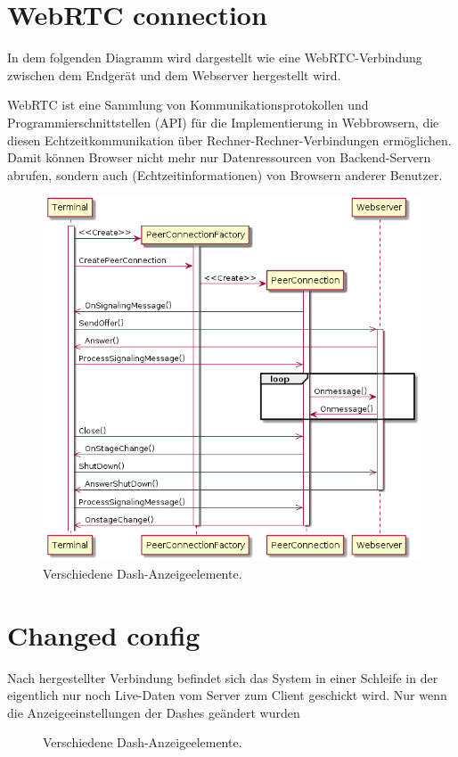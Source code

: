 \documentclass[entwurf.tex]{subfiles}
\begin{document}
  	\section{WebRTC connection}
		In dem folgenden Diagramm wird dargestellt wie eine WebRTC-Verbindung zwischen dem Endgerät und dem Webserver hergestellt wird.
		
		WebRTC ist eine Sammlung von Kommunikationsprotokollen und Programmierschnittstellen (API) für die Implementierung in Webbrowsern, die diesen Echtzeitkommunikation über Rechner-Rechner-Verbindungen ermöglichen. Damit können Browser nicht mehr nur Datenressourcen von Backend-Servern abrufen, sondern auch (Echtzeitinformationen) von Browsern anderer Benutzer.
		
		\begin{figure}[H]
			\begin{center}
	 			\includegraphics[width=\textwidth]{diagrams/DataTransferSequenz.png}
  				\caption{Verschiedene Dash-Anzeigeelemente.}
  			\end{center}
  		\end{figure}
  		
  	\newpage
  	\section{Changed config}
  		Nach hergestellter Verbindung befindet sich das System in einer Schleife in der eigentlich nur noch Live-Daten vom Server zum Client geschickt wird. Nur wenn die Anzeigeeinstellungen der Dashes geändert wurden 
  		\begin{figure}[H]
  			\begin{center}
  				\caption{Verschiedene Dash-Anzeigeelemente.}
  			\end{center}
  		\end{figure}
  		
\end{document}
